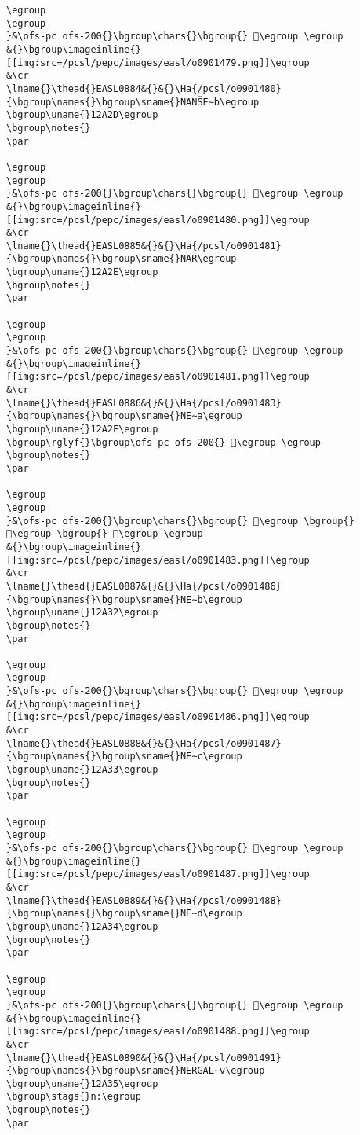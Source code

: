\begin{verbatim}
\egroup
\egroup
}&\ofs-pc ofs-200{}\bgroup\chars{}\bgroup{} 𒨬\egroup \egroup
&{}\bgroup\imageinline{}[[img:src=/pcsl/pepc/images/easl/o0901479.png]]\egroup
&\cr
\lname{}\thead{}EASL0884&{}&{}\Ha{/pcsl/o0901480}{\bgroup\names{}\bgroup\sname{}NANŠE∼b\egroup
\bgroup\uname{}12A2D\egroup
\bgroup\notes{}
\par 

\egroup
\egroup
}&\ofs-pc ofs-200{}\bgroup\chars{}\bgroup{} 𒨭\egroup \egroup
&{}\bgroup\imageinline{}[[img:src=/pcsl/pepc/images/easl/o0901480.png]]\egroup
&\cr
\lname{}\thead{}EASL0885&{}&{}\Ha{/pcsl/o0901481}{\bgroup\names{}\bgroup\sname{}NAR\egroup
\bgroup\uname{}12A2E\egroup
\bgroup\notes{}
\par 

\egroup
\egroup
}&\ofs-pc ofs-200{}\bgroup\chars{}\bgroup{} 𒨮\egroup \egroup
&{}\bgroup\imageinline{}[[img:src=/pcsl/pepc/images/easl/o0901481.png]]\egroup
&\cr
\lname{}\thead{}EASL0886&{}&{}\Ha{/pcsl/o0901483}{\bgroup\names{}\bgroup\sname{}NE∼a\egroup
\bgroup\uname{}12A2F\egroup
\bgroup\rglyf{}\bgroup\ofs-pc ofs-200{} 𒨯\egroup \egroup
\bgroup\notes{}
\par 

\egroup
\egroup
}&\ofs-pc ofs-200{}\bgroup\chars{}\bgroup{} 𒨯\egroup \bgroup{} 𒨰\egroup \bgroup{} 𒨱\egroup \egroup
&{}\bgroup\imageinline{}[[img:src=/pcsl/pepc/images/easl/o0901483.png]]\egroup
&\cr
\lname{}\thead{}EASL0887&{}&{}\Ha{/pcsl/o0901486}{\bgroup\names{}\bgroup\sname{}NE∼b\egroup
\bgroup\uname{}12A32\egroup
\bgroup\notes{}
\par 

\egroup
\egroup
}&\ofs-pc ofs-200{}\bgroup\chars{}\bgroup{} 𒨲\egroup \egroup
&{}\bgroup\imageinline{}[[img:src=/pcsl/pepc/images/easl/o0901486.png]]\egroup
&\cr
\lname{}\thead{}EASL0888&{}&{}\Ha{/pcsl/o0901487}{\bgroup\names{}\bgroup\sname{}NE∼c\egroup
\bgroup\uname{}12A33\egroup
\bgroup\notes{}
\par 

\egroup
\egroup
}&\ofs-pc ofs-200{}\bgroup\chars{}\bgroup{} 𒨳\egroup \egroup
&{}\bgroup\imageinline{}[[img:src=/pcsl/pepc/images/easl/o0901487.png]]\egroup
&\cr
\lname{}\thead{}EASL0889&{}&{}\Ha{/pcsl/o0901488}{\bgroup\names{}\bgroup\sname{}NE∼d\egroup
\bgroup\uname{}12A34\egroup
\bgroup\notes{}
\par 

\egroup
\egroup
}&\ofs-pc ofs-200{}\bgroup\chars{}\bgroup{} 𒨴\egroup \egroup
&{}\bgroup\imageinline{}[[img:src=/pcsl/pepc/images/easl/o0901488.png]]\egroup
&\cr
\lname{}\thead{}EASL0890&{}&{}\Ha{/pcsl/o0901491}{\bgroup\names{}\bgroup\sname{}NERGAL∼v\egroup
\bgroup\uname{}12A35\egroup
\bgroup\stags{}n:\egroup
\bgroup\notes{}
\par 


\end{verbatim}
